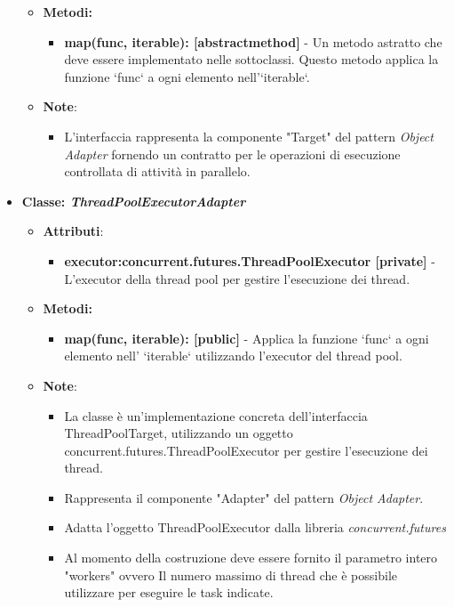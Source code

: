 \begin{itemize}
    \begin{itemize}
        \item\textbf{Metodi: }
        \begin{itemize}
            \item \textbf{map(func, iterable): [abstractmethod]} - Un metodo astratto che deve essere implementato nelle sottoclassi. Questo metodo applica la funzione `func` a ogni elemento nell'`iterable`.
        \end{itemize}
        \item\textbf{Note}:
        \begin{itemize}
            \item L'interfaccia rappresenta la componente "Target" del pattern \textit{Object Adapter} fornendo un contratto per le operazioni di esecuzione controllata di attività in parallelo.
        \end{itemize}
    \end{itemize}
    \item{\textbf{Classe: \textit{ThreadPoolExecutorAdapter}}}
    \begin{itemize}
        \item\textbf{Attributi}:
        \begin{itemize}
            \item \textbf{executor:concurrent.futures.ThreadPoolExecutor [private]} - L'executor della thread pool per gestire l'esecuzione dei thread.
        \end{itemize}
        \item \textbf{Metodi: }
        \begin{itemize}
            \item \textbf{map(func, iterable): [public]} - Applica la funzione `func` a ogni elemento nell' `iterable` utilizzando l'executor del thread pool.
        \end{itemize}
        \item\textbf{Note}:
        \begin{itemize}
            \item La classe è un'implementazione concreta dell'interfaccia ThreadPoolTarget, utilizzando un oggetto concurrent.futures.ThreadPoolExecutor per gestire l'esecuzione dei thread.
            \item Rappresenta il componente "Adapter" del pattern \textit{Object Adapter}.
            \item Adatta l'oggetto ThreadPoolExecutor dalla libreria \textit{concurrent.futures}
            \item Al momento della costruzione deve essere fornito il parametro intero "workers" ovvero
            Il numero massimo di thread che è possibile utilizzare per eseguire le task indicate.
        \end{itemize}
    \end{itemize}
\end{itemize}


